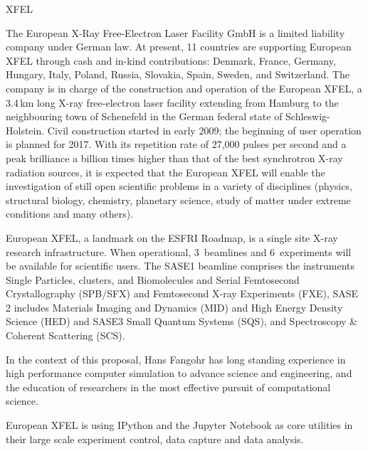 \begin{sitedescription}{XFEL}
  \label{sitedescription:xfel}



  The European X-Ray Free-Electron Laser Facility GmbH is a limited
  liability company under German law. At present, 11 countries are
  supporting European XFEL through cash and in-kind contributions:
  Denmark, France, Germany, Hungary, Italy, Poland, Russia, Slovakia,
  Spain, Sweden, and Switzerland. The company is in charge of the
  construction and operation of the European XFEL, a 3.4$\,$km long X-ray
  free-electron laser facility extending from Hamburg to the
  neighbouring town of Schenefeld in the German federal state of
  Schleswig-Holstein. Civil construction started in early 2009; the
  beginning of user operation is planned for 2017. With its repetition
  rate of 27,000 pulses per second and a peak brilliance a billion
  times higher than that of the best synchrotron X-ray radiation
  sources, it is expected that the European XFEL will enable the
  investigation of still open scientific problems in a variety of
  disciplines (physics, structural biology, chemistry, planetary
  science, study of matter under extreme conditions and many others).

  European XFEL, a landmark on the ESFRI Roadmap, is a single site
  X-ray research infrastructure. When operational, 3~beamlines and
  6~experiments will be available for scientific users. The SASE1
  beamline comprises the instruments Single Particles, clusters, and
  Biomolecules and Serial Femtosecond Crystallography (SPB/SFX) and
  Femtosecond X-ray Experiments (FXE), SASE 2 includes Materials
  Imaging and Dynamics (MID) and High Energy Density Science (HED) and
  SASE3 Small Quantum Systems (SQS), and Spectroscopy \& Coherent
  Scattering (SCS).


\medskip In the context of this proposal, Hans Fangohr has long
standing experience in high performance computer simulation to advance
science and engineering, and the education of researchers in the
most effective pursuit of computational science.

European XFEL is using IPython and the Jupyter
Notebook as core utilities in their large scale experiment control,
data capture and data analysis.


\end{sitedescription}
